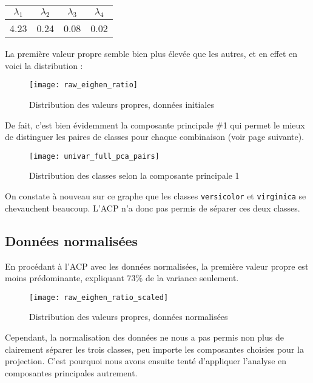 \documentclass[french]{report}
\begin{document}
    \begin{table}[h]
        \centering
        \begin{tabular}{|c c c c|}
            \hline
            $\lambda_1$ & $\lambda_2$ & $\lambda_3$ & $\lambda_4$ \\
            \hline
            4.23 & 0.24 & 0.08 & 0.02 \\
            \hline
        \end{tabular}
    \end{table}
    
    La première valeur propre semble bien plus élevée que les autres, et en effet en voici la distribution :
    
    \begin{figure}[h]
        \centering
        \texttt{[image: raw\_eighen\_ratio]}
        \caption{Distribution des valeurs propres, données initiales}
    \end{figure}
    \leavevmode
    
    De fait, c'est bien évidemment la composante principale \#1 qui permet le mieux de distinguer les paires de classes pour chaque combinaison (voir page suivante).
    
    \begin{figure}[h]
        \centering
        \texttt{[image: univar\_full\_pca\_pairs]}
        \caption{Distribution des classes selon la composante principale 1}
    \end{figure}
    
    On constate à nouveau sur ce graphe que les classes \texttt{versicolor} et \texttt{virginica} se chevauchent beaucoup.
    L'ACP n'a donc pas permis de séparer ces deux classes.
    
    \subsection{Données normalisées}
    
    En procédant à l'ACP avec les données normalisées, la première valeur propre est moins prédominante, expliquant 73\% de la variance seulement.
    
    \begin{figure}[h]
        \centering
        \texttt{[image: raw\_eighen\_ratio\_scaled]}
        \caption{Distribution des valeurs propres, données normalisées}
    \end{figure}
    
    \newpage
    Cependant, la normalisation des données ne nous a pas permis non plus de clairement séparer les trois classes, peu importe les composantes choisies pour la projection.
    C'est pourquoi nous avons ensuite tenté d'appliquer l'analyse en composantes principales autrement.
    
\end{document}

